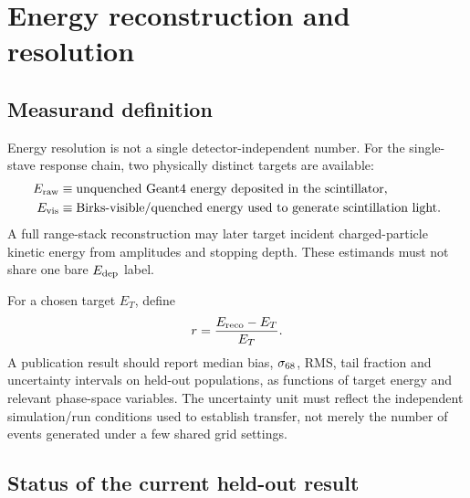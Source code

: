 \section{Energy reconstruction and resolution}

\subsection{Measurand definition}

Energy resolution is not a single detector-independent number. For the single-stave response chain, two physically distinct targets are available:
\begin{align}
E_{\rm raw} &\equiv \text{unquenched Geant4 energy deposited in the scintillator},\\
E_{\rm vis} &\equiv \text{Birks-visible/quenched energy used to generate scintillation light}.
\end{align}
A full range-stack reconstruction may later target incident charged-particle kinetic energy from amplitudes and stopping depth. These estimands must not share one bare \(E_{\rm dep}\) label.

For a chosen target \(E_T\), define
\[
r=\frac{E_{\rm reco}-E_T}{E_T}.
\]
A publication result should report median bias, \(\sigma_{68}\), RMS, tail fraction and uncertainty intervals on held-out populations, as functions of target energy and relevant phase-space variables. The uncertainty unit must reflect the independent simulation/run conditions used to establish transfer, not merely the number of events generated under a few shared grid settings.

\subsection{Status of the current held-out result}

